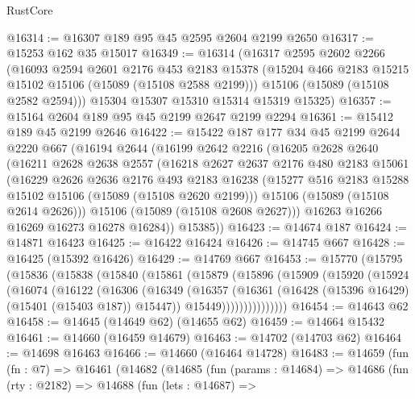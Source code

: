 \begin{lexlean}{RustCore}
\begin{coremodule}
@16314 := @16307 @189 @95 @45 @2595 @2604 @2199 @2650
@16317 := @15253 @162 @35 @15017
@16349 := @16314
    (@16317
      @2595
      @2602
      @2266
      (@16093
        @2594
        @2601
        @2176
        @453
        @2183
        @15378
        (@15204 @466 @2183 @15215 @15102 @15106 (@15089 (@15108 @2588 @2199)))
        @15106
        (@15089 (@15108 @2582 @2594)))
      @15304
      @15307
      @15310
      @15314
      @15319
      @15325)
@16357 := @15164 @2604 @189 @95 @45 @2199 @2647 @2199 @2294
@16361 := @15412 @189 @45 @2199 @2646
@16422 := @15422
    @187
    @177
    @34
    @45
    @2199
    @2644
    @2220
    @667
    (@16194
      @2644
      (@16199
        @2642
        @2216
        (@16205
          @2628
          @2640
          (@16211
            @2628
            @2638
            @2557
            (@16218
              @2627
              @2637
              @2176
              @480
              @2183
              @15061
              (@16229
                @2626
                @2636
                @2176
                @493
                @2183
                @16238
                (@15277 @516 @2183 @15288 @15102 @15106 (@15089 (@15108 @2620 @2199)))
                @15106
                (@15089 (@15108 @2614 @2626)))
              @15106
              (@15089 (@15108 @2608 @2627)))
            @16263
            @16266
            @16269
            @16273
            @16278
            @16284))
        @15385))
@16423 := @14674 @187
@16424 := @14871 @16423
@16425 := @16422 @16424
@16426 := @14745 @667
@16428 := @16425 (@15392 @16426)
@16429 := @14769 @667
@16453 := @15770
    (@15795
      (@15836
        (@15838
          (@15840
            (@15861
              (@15879
                (@15896
                  (@15909
                    (@15920
                      (@15924
                        (@16074
                          (@16122
                            (@16306
                              (@16349
                                (@16357
                                  (@16361 (@16428 (@15396 @16429) (@15401 (@15403 @187)) @15447))
                                  @15449)))))))))))))))
@16454 := @14643 @62
@16458 := @14645 (@14649 @62) (@14655 @62)
@16459 := @14664 @15432
@16461 := @14660 (@16459 @14679)
@16463 := @14702 (@14703 @62)
@16464 := @14698 @16463
@16466 := @14660 (@16464 @14728)
@16483 := @14659
    (fun (fn : @7) =>
    @16461
      (@14682
        (@14685
          (fun (params : @14684) =>
          @14686
            (fun (rty : @2182) =>
            @14688
              (fun (lets : @14687) =>

\end{coremodule}
\end{lexlean}
